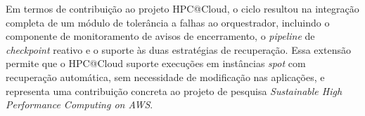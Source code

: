 \documentclass[a4paper,11pt]{article}
\begin{document}
        Em termos de contribuição ao projeto HPC@Cloud, o ciclo resultou na
        integração completa de um módulo de tolerância a falhas ao orquestrador,
        incluindo o componente de monitoramento de avisos de encerramento, o
        \textit{pipeline} de \textit{checkpoint} reativo e o suporte às duas
        estratégias de recuperação. Essa extensão permite que o HPC@Cloud suporte
        execuções em instâncias \textit{spot} com recuperação automática, sem
        necessidade de modificação nas aplicações, e representa uma contribuição
        concreta ao projeto de pesquisa \textit{Sustainable High Performance
        Computing on AWS}.

    \renewcommand*{\bibfont}{\scriptsize}
    \printbibliography
\end{document}
